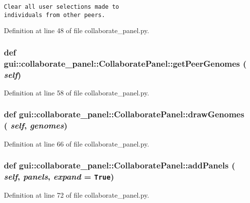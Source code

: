 \footnotesize\begin{verbatim}
Clear all user selections made to
individuals from other peers.
\end{verbatim}
\normalsize
 

Definition at line 48 of file collaborate\_\-panel.py.
\subsubsection{\setlength{\rightskip}{0pt plus 5cm}def gui::collaborate\_\-panel::CollaboratePanel::getPeerGenomes ( {\em self})}\label{classgui_1_1collaborate__panel_1_1CollaboratePanel_c42cda82b06563d6cc90763424f739b4}




Definition at line 58 of file collaborate\_\-panel.py.
\subsubsection{\setlength{\rightskip}{0pt plus 5cm}def gui::collaborate\_\-panel::CollaboratePanel::drawGenomes ( {\em self},  {\em genomes})}\label{classgui_1_1collaborate__panel_1_1CollaboratePanel_e61b72bccc8c5ed04003ffcd8d60b2b0}




Definition at line 66 of file collaborate\_\-panel.py.
\subsubsection{\setlength{\rightskip}{0pt plus 5cm}def gui::collaborate\_\-panel::CollaboratePanel::addPanels ( {\em self},  {\em panels},  {\em expand} = {\tt True})}\label{classgui_1_1collaborate__panel_1_1CollaboratePanel_3f3197260192ebcba72f3d0edaeb961f}




Definition at line 72 of file collaborate\_\-panel.py.

